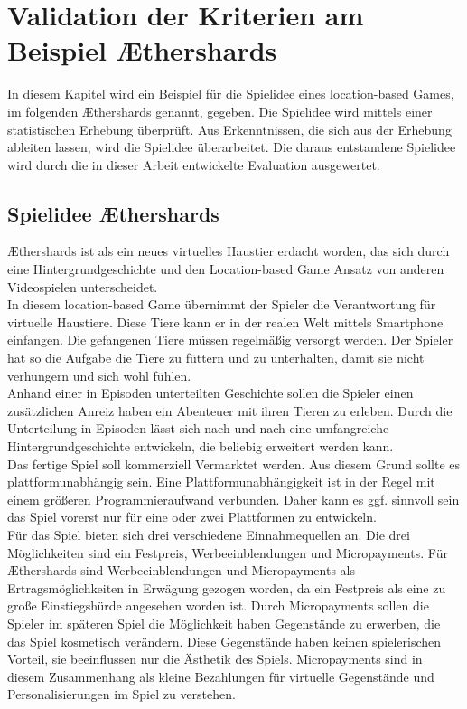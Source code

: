 \chapter{Validation der Kriterien am Beispiel Æthershards}
\label{cha:evaluation}

In diesem Kapitel wird ein Beispiel für die Spielidee eines location-based Games, im folgenden Æthershards genannt, gegeben. Die Spielidee wird mittels einer statistischen Erhebung überprüft. Aus Erkenntnissen, die sich aus der Erhebung ableiten lassen, wird die Spielidee überarbeitet. Die daraus entstandene Spielidee wird durch die in dieser Arbeit entwickelte Evaluation ausgewertet.



\section{Spielidee Æthershards}
Æthershards ist als ein neues virtuelles Haustier erdacht worden, das sich durch eine Hintergrundgeschichte und den Location-based Game Ansatz von anderen Videospielen unterscheidet. \\
In diesem location-based Game übernimmt der Spieler die Verantwortung für virtuelle Haustiere. Diese Tiere kann er in der realen Welt mittels Smartphone einfangen. Die gefangenen Tiere müssen regelmäßig versorgt werden. Der Spieler hat so die Aufgabe die Tiere zu füttern und zu unterhalten, damit sie nicht verhungern und sich wohl fühlen.\\ 
Anhand einer in Episoden unterteilten Geschichte sollen die Spieler einen zusätzlichen Anreiz haben ein Abenteuer mit ihren Tieren zu erleben. Durch die Unterteilung in Episoden lässt sich nach und nach eine umfangreiche Hintergrundgeschichte entwickeln, die beliebig erweitert werden kann. \\
Das fertige Spiel soll kommerziell Vermarktet werden. Aus diesem Grund sollte es plattformunabhängig sein. Eine Plattformunabhängigkeit ist in der Regel mit einem größeren Programmieraufwand verbunden. Daher kann es ggf. sinnvoll sein das Spiel vorerst nur für eine oder zwei Plattformen zu entwickeln. \\
Für das Spiel bieten sich drei verschiedene Einnahmequellen an. Die drei Möglichkeiten sind ein Festpreis, Werbeeinblendungen und Micropayments. Für Æthershards sind Werbeeinblendungen und Micropayments als Ertragsmöglichkeiten in Erwägung gezogen worden, da ein Festpreis als eine zu große Einstiegshürde angesehen worden ist. Durch Micropayments sollen die Spieler im späteren Spiel die Möglichkeit haben Gegenstände zu erwerben, die das Spiel kosmetisch verändern. Diese Gegenstände haben keinen spielerischen Vorteil, sie beeinflussen nur die Ästhetik des Spiels. Micropayments sind in diesem Zusammenhang als kleine Bezahlungen für virtuelle Gegenstände und Personalisierungen im Spiel zu verstehen.



